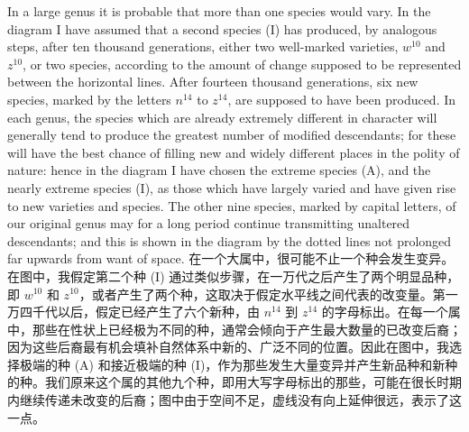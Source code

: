\darwinpair
{In a large genus it is probable that more than one species would vary. In the diagram I have assumed that a second species (I) has produced, by analogous steps, after ten thousand generations, either two well-marked varieties, $w^{10}$ and $z^{10}$, or two species, according to the amount of change supposed to be represented between the horizontal lines. After fourteen thousand generations, six new species, marked by the letters $n^{14}$ to $z^{14}$, are supposed to have been produced. In each genus, the species which are already extremely different in character will generally tend to produce the greatest number of modified descendants; for these will have the best chance of filling new and widely different places in the polity of nature: hence in the diagram I have chosen the extreme species (A), and the nearly extreme species (I), as those which have largely varied and have given rise to new varieties and species. The other nine species, marked by capital letters, of our original genus may for a long period continue transmitting unaltered descendants; and this is shown in the diagram by the dotted lines not prolonged far upwards from want of space.}
{在一个大属中，很可能不止一个种会发生变异。在图中，我假定第二个种 (I) 通过类似步骤，在一万代之后产生了两个明显品种，即 $w^{10}$ 和 $z^{10}$，或者产生了两个种，这取决于假定水平线之间代表的改变量。第一万四千代以后，假定已经产生了六个新种，由 $n^{14}$ 到 $z^{14}$ 的字母标出。在每一个属中，那些在性状上已经极为不同的种，通常会倾向于产生最大数量的已改变后裔；因为这些后裔最有机会填补自然体系中新的、广泛不同的位置。因此在图中，我选择极端的种 (A) 和接近极端的种 (I)，作为那些发生大量变异并产生新品种和新种的种。我们原来这个属的其他九个种，即用大写字母标出的那些，可能在很长时期内继续传递未改变的后裔；图中由于空间不足，虚线没有向上延伸很远，表示了这一点。}


